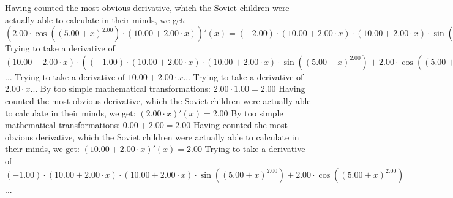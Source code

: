\documentclass{article}
\begin{document}
 \newline
 \newline 
Having counted the most obvious derivative, which the Soviet children were actually able to calculate in their minds, we get:
$({{2.00} \cdot { \cos {\left({\left({{5.00} + {x}}\right) ^ {2.00}}\right)}  \cdot \left({{10.00} + {{2.00} \cdot {x}}}\right)}})'(x) = {{\left({-2.00}\right) \cdot {\left({{10.00} + {{2.00} \cdot {x}}}\right) \cdot {\left({{10.00} + {{2.00} \cdot {x}}}\right) \cdot  \sin {\left({\left({{5.00} + {x}}\right) ^ {2.00}}\right)} }}} + {{4.00} \cdot  \cos {\left({\left({{5.00} + {x}}\right) ^ {2.00}}\right)} }}$\newline
\newline
Trying to take a derivative of ${\left({{10.00} + {{2.00} \cdot {x}}}\right) \cdot \left({{\left({-1.00}\right) \cdot {\left({{10.00} + {{2.00} \cdot {x}}}\right) \cdot {\left({{10.00} + {{2.00} \cdot {x}}}\right) \cdot  \sin {\left({\left({{5.00} + {x}}\right) ^ {2.00}}\right)} }}} + {{2.00} \cdot  \cos {\left({\left({{5.00} + {x}}\right) ^ {2.00}}\right)} }}\right)}$...\newline
\newline
Trying to take a derivative of ${{10.00} + {{2.00} \cdot {x}}}$...\newline
\newline
Trying to take a derivative of ${{2.00} \cdot {x}}$...\newline
\newline
By too simple mathematical transformations:
 ${{2.00} \cdot {1.00}} = {2.00}$ 
 \newline
 \newline 
Having counted the most obvious derivative, which the Soviet children were actually able to calculate in their minds, we get:
$({{2.00} \cdot {x}})'(x) = {2.00}$\newline
\newline
By too simple mathematical transformations:
 ${{0.00} + {2.00}} = {2.00}$ 
 \newline
 \newline 
Having counted the most obvious derivative, which the Soviet children were actually able to calculate in their minds, we get:
$({{10.00} + {{2.00} \cdot {x}}})'(x) = {2.00}$\newline
\newline
Trying to take a derivative of ${{\left({-1.00}\right) \cdot {\left({{10.00} + {{2.00} \cdot {x}}}\right) \cdot {\left({{10.00} + {{2.00} \cdot {x}}}\right) \cdot  \sin {\left({\left({{5.00} + {x}}\right) ^ {2.00}}\right)} }}} + {{2.00} \cdot  \cos {\left({\left({{5.00} + {x}}\right) ^ {2.00}}\right)} }}$...\newline
\end{document}
